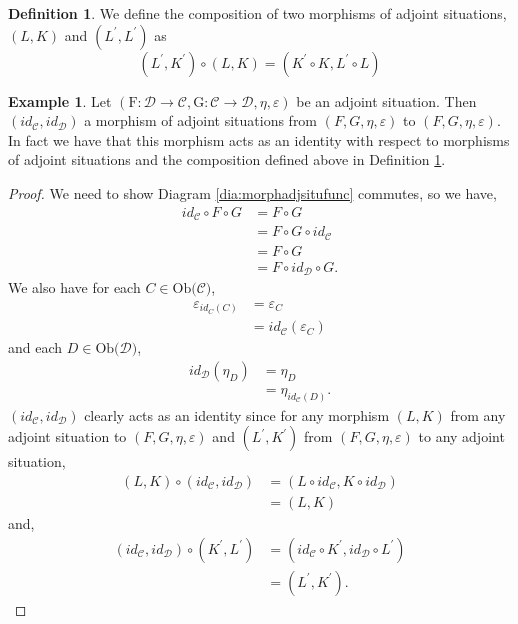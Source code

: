 \documentclass[11pt,a4paper]{article}
\theoremstyle{definition}
\newtheorem{definition}[thm]{Definition}
\newtheorem{example}[thm]{Example}
\newcommand\ob[1]{\mathrm{Ob(}#1\mathrm{)}}
\newcommand\cat[1]{\mathscr{#1}}
\newcommand\func[3]{\mathrm{#1}\colon#2\rightarrow#3}
\numberwithin{equation}{section}
\begin{document}
\begin{definition}
    \label{def:compadjsit}
    We define the composition of two morphisms of adjoint situations, $(L,K)$ and $(L^\prime,L^\prime)$ as \[(L^\prime,K^\prime)\circ(L,K) = (K^\prime \circ K, L^\prime \circ L)\]
\end{definition}
\begin{example}
    \label{exe:identityadjsitumorph}
    Let $(\func{F}{\cat{D}}{\cat{C}},\func{G}{\cat{C}}{\cat{D}},\eta,\varepsilon)$ be an adjoint situation. Then $(id_{\cat{C}},id_{\cat{D}})$ a morphism of adjoint situations from $(F,G,\eta,\varepsilon)$ to $(F,G,\eta,\varepsilon)$. In fact we have that this morphism acts as an identity with respect to morphisms of adjoint situations and the composition defined above in Definition \ref{def:compadjsit}.
\end{example}
\begin{proof}
    We need to show Diagram \ref{dia:morphadjsitufunc} commutes, so we have,
    \begin{align*}
        id_{\cat{C}}\circ F\circ G &= F\circ G \\
        &= F\circ G\circ id_{\cat{C}} \\
        &= F\circ G \\
        &= F\circ id_{\cat{D}} \circ G.
    \end{align*}
    We also have for each $C\in\ob{\cat{C}}$,
    \begin{align*}
        \varepsilon_{id_{C}(C)} &= \varepsilon_{C} \\
        &= id_{\cat{C}}(\varepsilon_C)
    \end{align*}
    and each $D\in\ob{\cat{D}}$,
    \begin{align*}
        id_{\cat{D}}(\eta_{D}) &= \eta_{D} \\
        &= \eta_{id_{\cat{C}}(D)}.
    \end{align*}
    $(id_{\cat{C}},id_{\cat{D}})$ clearly acts as an identity since for any morphism $(L,K)$ from any adjoint situation to $(F,G,\eta,\varepsilon)$ and $(L^\prime,K^\prime)$ from $(F,G,\eta,\varepsilon)$ to any adjoint situation,
    \begin{align*}
        (L,K)\circ(id_{\cat{C}},id_{\cat{D}}) &= (L\circ id_{\cat{C}},K\circ id_{\cat{D}})\\
        &= (L,K)
    \end{align*}
    and,
    \begin{align*}
        (id_{\cat{C}},id_{\cat{D}})\circ(K^\prime,L^\prime) &= (id_{\cat{C}}\circ K^\prime,id_{\cat{D}}\circ L^\prime)\\
        &= (L^\prime,K^\prime).
    \end{align*}
\end{proof}
\end{document}
